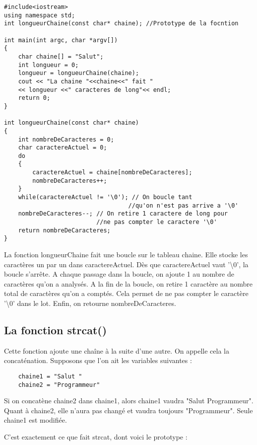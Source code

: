 \documentclass[a4paper, oneside,11pt]{book}
\begin{document}
\begin{lstlisting}
#include<iostream>
using namespace std;
int longueurChaine(const char* chaine); //Prototype de la focntion 

int main(int argc, char *argv[])
{
    char chaine[] = "Salut";
    int longueur = 0;
    longueur = longueurChaine(chaine);
    cout << "La chaine "<<chaine<<" fait "
    << longueur <<" caracteres de long"<< endl; 
    return 0;
}

int longueurChaine(const char* chaine)
{
    int nombreDeCaracteres = 0;
    char caractereActuel = 0;
    do
    {
        caractereActuel = chaine[nombreDeCaracteres];
        nombreDeCaracteres++;
    }
    while(caractereActuel != '\0'); // On boucle tant 
                                   //qu'on n'est pas arrive a '\0'
    nombreDeCaracteres--; // On retire 1 caractere de long pour 
                          //ne pas compter le caractere '\0'
    return nombreDeCaracteres;
}
\end{lstlisting}


La fonction longueurChaine fait une boucle sur le tableau chaine. Elle stocke les caract\`eres un par un dans caractereActuel. D\`es que caractereActuel vaut '\textbackslash 0', 
la boucle s'arr\^ete.
A chaque passage dans la boucle, on ajoute 1 au nombre de caract\`eres qu'on 
a analys\'es. A la fin de la boucle, on retire 1 caract\`ere au nombre total 
de caract\`eres qu'on a compt\'es. Cela permet de ne pas compter le 
caract\`ere '\textbackslash 0' dans le lot. Enfin, on retourne nombreDeCaracteres.

\subsection{La fonction strcat()}

Cette fonction ajoute une cha\^ine \`a la suite d'une autre. On appelle cela la concat\'enation.
Supposons que l'on ait les variables suivantes :

\begin{lstlisting}
    chaine1 = "Salut "
    chaine2 = "Programmeur"
\end{lstlisting}




Si on concat\`ene chaine2 dans chaine1, alors chaine1 vaudra "Salut Programmeur". Quant \`a
chaine2, elle n'aura pas chang\'e et vaudra toujours "Programmeur". Seule chaine1 est modifi\'ee.

C'est exactement ce que fait strcat, dont voici le prototype :
\end{document}
